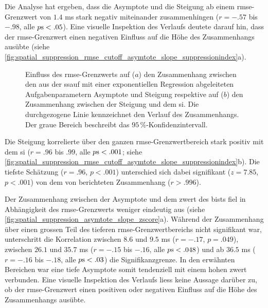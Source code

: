 \documentclass[11pt, twoside, a4paper]{book}		%
\begin{document}
Die Analyse hat ergeben, dass die Asymptote und die Steigung ab einem \gls{rmse}-Grenzwert von $1.4$ ms stark negativ miteinander zusammenhingen ($r=-.57$ bis $-.98$, alle $p\textnormal{s}<.05$). Eine visuelle Inspektion des Verlaufs deutete darauf hin, dass der \gls{rmse}-Grenzwert einen negativen Einfluss auf die Höhe des Zusammenhangs ausübte (siehe \autoref{fig:spatial_suppression_rmse_cutoff_asymtote_slope_suppressionindex}a).

\begin{figure}[htbp]
	\centering
	\begin{adjustbox}{width=1\textwidth}
	\end{adjustbox}
	\newline
	\begin{adjustbox}{width=1\textwidth}
	\end{adjustbox}
	\caption[Einfluss des \gls{rmse}-Grenzwerts der \gls{ssauf} auf den Zusammenhang zwischen der Asymptote, der Steigung und dem \gls{si}]{Einfluss des \gls{rmse}-Grenzwerts auf ($a$) den Zusammenhang zwischen den aus der \gls{ssauf} mit einer exponentiellen Regression abgeleiteten Aufgabenparametern Asymptote und Steigung respektive auf ($b$) den Zusammenhang zwischen der Steigung und dem \gls{si}. Die durchgezogene Linie kennzeichnet den Verlauf des Zusammenhangs. Der graue Bereich beschreibt das $95\,\%$-Konfidenzintervall.}
	\label{fig:spatial_suppression_rmse_cutoff_asymtote_slope_suppressionindex}
\end{figure}

Die Steigung korrelierte über den ganzen \gls{rmse}-Grenzwertbereich stark positiv mit dem \gls{si} ($r=.96$ bis $.99$, alle $p\textnormal{s}<.001$; siehe \autoref{fig:spatial_suppression_rmse_cutoff_asymtote_slope_suppressionindex}b). Die tiefste Schätzung ($r=.96$, $p<.001$) unterschied sich dabei signifikant ($z=7.85$, $p<.001$) von dem von \citet{Melnick2013} berichteten Zusammenhang ($r>.996$).

Der Zusammenhang zwischen der Asymptote und dem \gls{zwert} des \gls{bist}s fiel in Abhängigkeit des \gls{rmse}-Grenzwerts weniger eindeutig aus (siehe \autoref{fig:spatial_suppression_asymtote_slope_zscore}a).
Während der Zusammenhang über einen grossen Teil des tieferen \gls{rmse}-Grenzwertbereichs nicht signifikant war, unterschritt die Korrelation zwischen $8.6$ und $9.5$ ms ($r = -.17$, $p = .049$), zwischen $26.1$ und $35.7$ ms ($r = -.15$ bis $ -.16$, alle $p\textnormal{s} < .048$) und ab $36.5$ ms ($r = -.16$ bis $-.18$, alle $p\textnormal{s} < .03$) die Signifikanzgrenze. In den erwähnten Bereichen war eine tiefe Asymptote somit tendenziell mit einem hohen \gls{zwert} verbunden. Eine visuelle Inspektion des Verlaufs liess keine Aussage darüber zu, ob der  \gls{rmse}-Grenzwert einen positiven oder negativen Einfluss auf die Höhe des Zusammenhangs ausübte.
\end{document}
